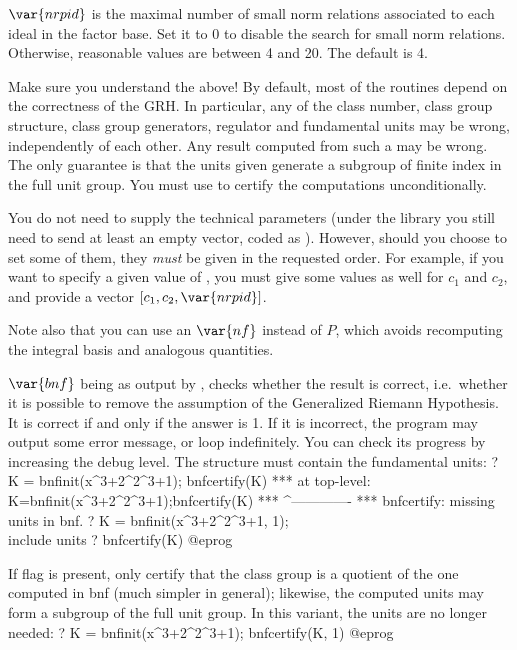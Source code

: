 $\var{nrpid}$ is the maximal number of small norm relations associated to each
ideal in the factor base. Set it to $0$ to disable the search for small norm
relations. Otherwise, reasonable values are between 4 and 20. The default is
4.

 Make sure you understand the above! By default, most of
the  routines depend on the correctness of the GRH. In particular,
any of the class number, class group structure, class group generators,
regulator and fundamental units may be wrong, independently of each other.
Any result computed from such a  may be wrong. The only guarantee is
that the units given generate a subgroup of finite index in the full unit
group. You must use  to certify the computations
unconditionally.


You do not need to supply the technical parameters (under the library you
still need to send at least an empty vector, coded as ). However,
should you choose to set some of them, they \emph{must} be given in the
requested order. For example, if you want to specify a given value of
, you must give some values as well for $c_1$ and $c_2$, and provide
a vector $[c_1,c_2,\var{nrpid}]$.

Note also that you can use an $\var{nf}$ instead of $P$, which avoids
recomputing the integral basis and analogous quantities.

\smallskip


\label{se:bnfcertify}
$\var{bnf}$ being as output by
, checks whether the result is correct, i.e.~whether it is
possible to remove the assumption of the Generalized Riemann
Hypothesis. It is correct if and only if the answer is 1. If it is
incorrect, the program may output some error message, or loop indefinitely.
You can check its progress by increasing the debug level. The 
structure must contain the fundamental units:
\bprog
? K = bnfinit(x^3+2^2^3+1); bnfcertify(K)
  ***   at top-level: K=bnfinit(x^3+2^2^3+1);bnfcertify(K)
  ***                                        ^-------------
  *** bnfcertify: missing units in bnf.
? K = bnfinit(x^3+2^2^3+1, 1); \\ include units
? bnfcertify(K)
@eprog

If flag is present, only certify that the class group is a quotient of the
one computed in bnf (much simpler in general); likewise, the computed units
may form a subgroup of the full unit group. In this variant, the units are
no longer needed:
\bprog
? K = bnfinit(x^3+2^2^3+1); bnfcertify(K, 1)
@eprog

